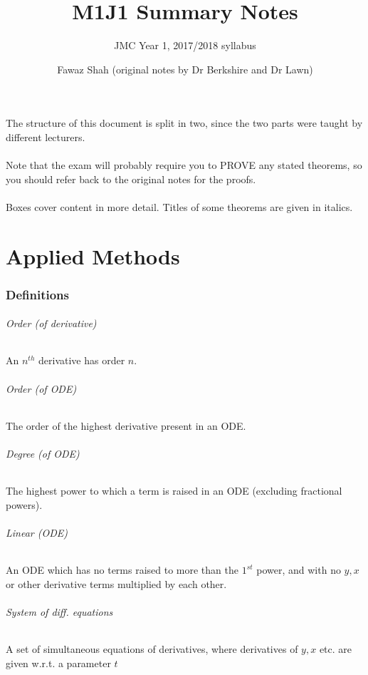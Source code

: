 \documentclass{scrartcl}
\title{M1J1 Summary Notes}
\subtitle{JMC Year 1, 2017/2018 syllabus}
\date{}
\author{Fawaz Shah (original notes by Dr Berkshire and Dr Lawn)}
\begin{document}
\large
\maketitle
\noindent The structure of this document is split in two, since the two parts were taught by different lecturers.
\\\\
Note that the exam will probably require you to PROVE any stated theorems, so you should refer back to the original notes for the proofs.
\\\\
Boxes cover content in more detail. Titles of some theorems are given in italics.
\tableofcontents
\newpage
\part{Applied Methods}

\section{Definitions}

\paragraph{Order (of derivative)}
An $ n^{th} $ derivative has order $ n $.

\paragraph{Order (of ODE)}
The order of the highest derivative present in an ODE.

\paragraph{Degree (of ODE)}
The highest power to which a term is raised in an ODE (excluding fractional powers).

\paragraph*{Linear (ODE)}
An ODE which has no terms raised to more than the $ 1^{st} $ power, and with no $ y, x $ or other derivative terms multiplied by each other.

\paragraph{System of diff. equations}
A set of simultaneous equations of derivatives, where derivatives of $ y, x $ etc. are given w.r.t. a parameter $ t $
\end{document}
